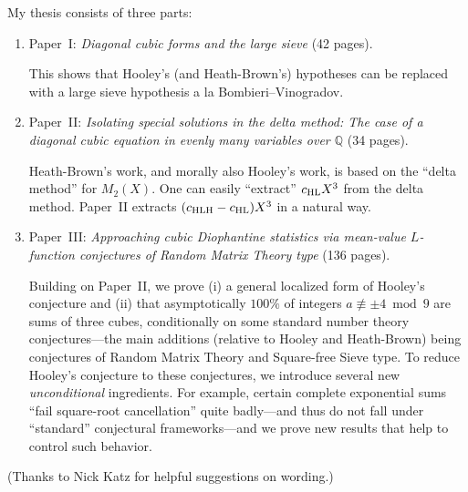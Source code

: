 \documentclass[12pt]{article}
\begin{document}
My thesis consists of three parts:
\begin{enumerate}
    \item Paper~I:
    \emph{Diagonal cubic forms and the large sieve}
    (42 pages).
    
    This shows that Hooley's (and Heath-Brown's) hypotheses can be replaced with
    a large sieve hypothesis a la Bombieri--Vinogradov.
    
    \item Paper~II:
    \emph{Isolating special solutions in the delta method:
    The case of a diagonal cubic equation in evenly many variables over $\mathbb{Q}$}
    (34 pages).
    
    Heath-Brown's work, and morally also Hooley's work, is based on the ``delta method'' for $M_2(X)$.
    One can easily ``extract'' $c_{\textnormal{HL}}X^3$ from the delta method.
    Paper~II extracts $(c_{\textnormal{HLH}}-c_{\textnormal{HL}})X^3$ in a natural way.
    
    \item Paper~III:
    \emph{Approaching cubic Diophantine statistics via mean-value $L$-function conjectures of Random Matrix Theory type}
    (136 pages).
    
    Building on Paper~II,
    we prove (i) a general localized form of Hooley's conjecture
    and (ii) that asymptotically $100\%$ of integers $a\not\equiv \pm4\bmod{9}$ are sums of three cubes,
    conditionally on some standard number theory conjectures---the main additions (relative to Hooley and Heath-Brown) being conjectures of Random Matrix Theory and Square-free Sieve type.
    To reduce Hooley's conjecture to these conjectures,
    we introduce several new \emph{unconditional} ingredients.
    For example, certain complete exponential sums ``fail square-root cancellation'' quite badly---and thus do not fall under ``standard'' conjectural frameworks---and we prove new results that help to control such behavior.
\end{enumerate}

(Thanks to Nick Katz for helpful suggestions on wording.)


\end{document}
